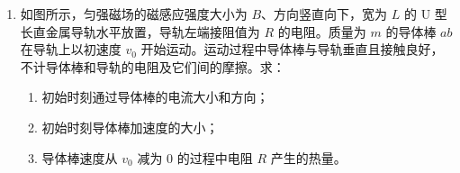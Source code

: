 \documentclass[\gkver]{gaokaozhenti}
\begin{document}
\begin{enumerate}
{\begin{enumerate}
	解得 $x_{0}=-\frac{b}{2k}$，$y_{0}=-\frac{b^{2}}{4k}$。

	则在 $O'xy$ 坐标系中钢球做平抛运动的抛出点坐标为 $\left(-\frac{b}{2k},-\frac{b^{2}}{4k}\right)$。
\end{enumerate}
}
\item
如图所示，匀强磁场的磁感应强度大小为 $B$、方向竖直向下，宽为 $L$ 的 U 型长直金属导轨水平放置，导轨左端接阻值为 $R$ 的电阻。质量为 $m$ 的导体棒 $ab$ 在导轨上以初速度 $v_{0}$ 开始运动。运动过程中导体棒与导轨垂直且接触良好，不计导体棒和导轨的电阻及它们间的摩擦。求：
\begin{enumerate}
	\item
	初始时刻通过导体棒的电流大小和方向；
	\item
	初始时刻导体棒加速度的大小；
	\item
	导体棒速度从 $v_{0}$ 减为 $0$ 的过程中电阻 $R$ 产生的热量。
\end{enumerate}
\onepicture[w=6.2cm, align=right]{}
\end{enumerate}
\end{document}
